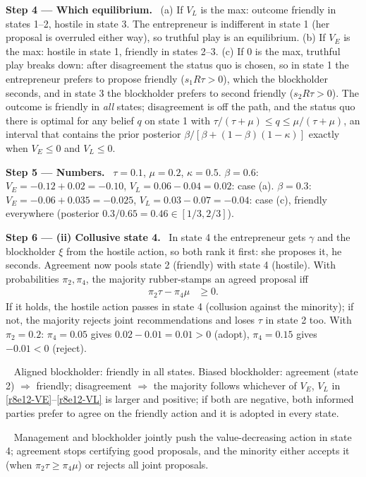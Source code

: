 \documentclass[11pt,a4paper]{article}
\newcommand{\step}[2]{\par\medskip\noindent\textbf{Step #1 --- #2.}~}
\newcommand{\answer}[1]{\par\smallskip\noindent\fbox{\textbf{Answer #1.}}~}
\begin{document}
\step{4}{Which equilibrium} (a) If $V_L$ is the max: outcome friendly in states 1--2, hostile in state 3. The entrepreneur is indifferent in state 1 (her proposal is overruled either way), so truthful play is an equilibrium. (b) If $V_E$ is the max: hostile in state 1, friendly in states 2--3. (c) If $0$ is the max, truthful play breaks down: after disagreement the status quo is chosen, so in state 1 the entrepreneur prefers to propose friendly ($s_1R\tau>0$), which the blockholder seconds, and in state 3 the blockholder prefers to second friendly ($s_2R\tau>0$). The outcome is friendly in \emph{all} states; disagreement is off the path, and the status quo there is optimal for any belief $q$ on state 1 with $\tau/(\tau+\mu)\le q\le\mu/(\tau+\mu)$, an interval that contains the prior posterior $\beta/[\beta+(1-\beta)(1-\kappa)]$ exactly when $V_E\le0$ and $V_L\le0$.

\step{5}{Numbers} $\tau=0.1$, $\mu=0.2$, $\kappa=0.5$. $\beta=0.6$: $V_E=-0.12+0.02=-0.10$, $V_L=0.06-0.04=0.02$: case (a). $\beta=0.3$: $V_E=-0.06+0.035=-0.025$, $V_L=0.03-0.07=-0.04$: case (c), friendly everywhere (posterior $0.3/0.65=0.46\in[1/3,2/3]$).

\step{6}{(ii) Collusive state 4} In state 4 the entrepreneur gets $\gamma$ and the blockholder $\xi$ from the hostile action, so both rank it first: she proposes it, he seconds. Agreement now pools state 2 (friendly) with state 4 (hostile). With probabilities $\pi_2,\pi_4$, the majority rubber-stamps an agreed proposal iff
\begin{align}
  \pi_2\tau-\pi_4\mu &\ge 0. \label{r8e12-agree}
\end{align}
If it holds, the hostile action passes in state 4 (collusion against the minority); if not, the majority rejects joint recommendations and loses $\tau$ in state 2 too. With $\pi_2=0.2$: $\pi_4=0.05$ gives $0.02-0.01=0.01>0$ (adopt), $\pi_4=0.15$ gives $-0.01<0$ (reject).

\answer{(i)} Aligned blockholder: friendly in all states. Biased blockholder: agreement (state 2) $\Rightarrow$ friendly; disagreement $\Rightarrow$ the majority follows whichever of $V_E$, $V_L$ in \eqref{r8e12-VE}--\eqref{r8e12-VL} is larger and positive; if both are negative, both informed parties prefer to agree on the friendly action and it is adopted in every state.
\answer{(ii)} Management and blockholder jointly push the value-decreasing action in state 4; agreement stops certifying good proposals, and the minority either accepts it (when $\pi_2\tau\ge\pi_4\mu$) or rejects all joint proposals.
\end{document}
